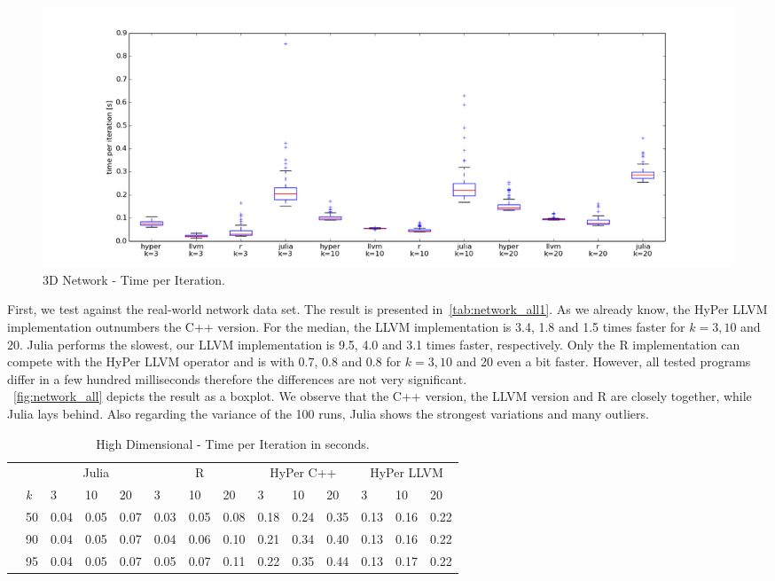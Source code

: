 \begin{figure}[htsb]
  \centerline{
  \includegraphics[scale=0.4, trim="0cm 1cm 0cm 0cm"]{figures/charts/network_all}
  }
  \caption[3D Network - Time per Iteration]{3D Network - Time per Iteration.}
  \label{fig:network_all}
\end{figure}

First, we test against the real-world network data set. The result is presented in~\autoref{tab:network_all1}. As we already know, the HyPer LLVM implementation outnumbers the C++ version. For the median, the LLVM implementation is 3.4, 1.8 and 1.5 times faster for $k = 3, 10$ and $20$. Julia performs the slowest, our LLVM implementation is 9.5, 4.0 and 3.1 times faster, respectively. Only the R implementation can compete with the HyPer LLVM operator and is with 0.7, 0.8 and 0.8 for $k = 3, 10$ and 20 even a bit faster. However, all tested programs differ in a few hundred milliseconds therefore the differences are not very significant.
\\
~\autoref{fig:network_all} depicts the result as a boxplot. We observe that the C++ version, the LLVM version and R are closely together, while Julia lays behind. Also regarding the variance of the 100 runs, Julia shows the strongest variations and many outliers.

\begin{table}[htsb]
  \caption[High Dimensional - Time per Iteration]{High Dimensional - Time per Iteration in seconds.}
  \label{tab:highdim_all}
  \centering
  \begin{tabular}{l l l ll |l l l |l l l |l l l}
    \toprule
      && \multicolumn{3}{c}{Julia} & \multicolumn{3}{c}{R} & \multicolumn{3}{c}{HyPer C++} & \multicolumn{3}{c}{HyPer LLVM}  \\
      &\emph{k} & 3 & 10 & 20 & 3 & 10 & 20 & 3 & 10 & 20 & 3 & 10 & 20 \\
    \midrule
      \parbox[t]{2mm}{} &50  & 0.04 & 0.05 & 0.07 & 0.03 & 0.05 & 0.08 & 0.18 & 0.24 & 0.35 & 0.13 & 0.16 & 0.22 \\
      &90  & 0.04 & 0.05 & 0.07 & 0.04 & 0.06 & 0.10 & 0.21 & 0.34 & 0.40 & 0.13 & 0.16 & 0.22 \\
      &95  & 0.04 & 0.05 & 0.07 & 0.05 & 0.07 & 0.11 & 0.22 & 0.35 & 0.44 & 0.13 & 0.17 & 0.22 \\
    \bottomrule
  \end{tabular}
\end{table}

